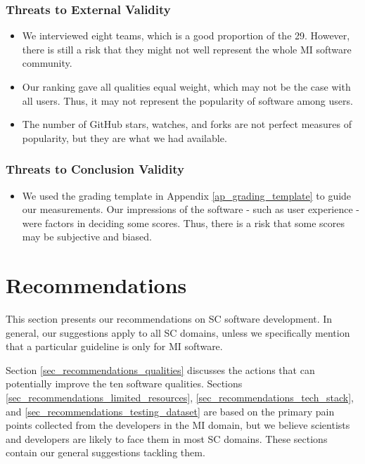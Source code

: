 \documentclass[final, 3p, times, authoryear]{elsarticle}
\begin{document}
\subsubsection{Threats to External Validity}
\begin{itemize}
\item We interviewed eight teams, which is a good proportion of the 29. However,
there is still a risk that they might not well represent the whole MI software
community.
\item Our ranking gave all qualities equal weight, which may not be the case
with all users. Thus, it may not represent the popularity of software among
users.
\item The number of GitHub stars, watches, and forks are not perfect measures of
popularity, but they are what we had available.
\end{itemize}

\subsubsection{Threats to Conclusion Validity}
\begin{itemize}
\item We used the grading template in Appendix \ref{ap_grading_template} to
guide our measurements. Our impressions of the software - such as user
experience - were factors in deciding some scores. Thus, there is a risk that
some scores may be subjective and biased.
\end{itemize}

\section{Recommendations} \label{ch_recommendations}

This section presents our recommendations on SC software development. In
general, our suggestions apply to all SC domains, unless we specifically mention
that a particular guideline is only for MI software.

Section \ref{sec_recommendations_qualities} discusses the actions that can
potentially improve the ten software qualities. Sections
\ref{sec_recommendations_limited_resources},
\ref{sec_recommendations_tech_stack}, and
\ref{sec_recommendations_testing_dataset} are based on the primary pain points
collected from the developers in the MI domain, but we believe scientists and
developers are likely to face them in most SC domains. These sections contain
our general suggestions tackling them. 
\end{document}
